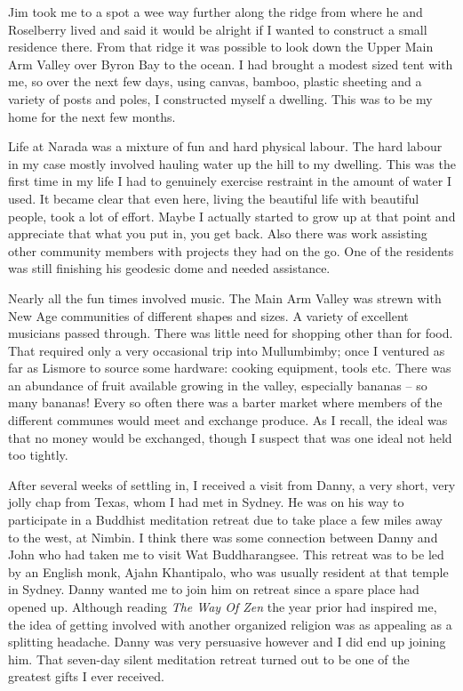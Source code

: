 Jim took me to a spot a wee way further along the ridge from where he
and Roselberry lived and said it would be alright if I wanted to
construct a small residence there. From that ridge it was possible to
look down the Upper Main Arm Valley over Byron Bay to the ocean. I had
brought a modest sized tent with me, so over the next few days, using
canvas, bamboo, plastic sheeting and a variety of posts and poles, I
constructed myself a dwelling. This was to be my home for the next few
months.

Life at Narada was a mixture of fun and hard physical labour. The hard
labour in my case mostly involved hauling water up the hill to my
dwelling. This was the first time in my life I had to genuinely exercise
restraint in the amount of water I used. It became clear that even here,
living the beautiful life with beautiful people, took a lot of effort.
Maybe I actually started to grow up at that point and appreciate that
what you put in, you get back. Also there was work assisting other
community members with projects they had on the go. One of the residents
was still finishing his geodesic dome and needed assistance.

Nearly all the fun times involved music. The Main Arm Valley was strewn
with New Age communities of different shapes and sizes. A variety of
excellent musicians passed through. There was little need for shopping
other than for food. That required only a very occasional trip into
Mullumbimby; once I ventured as far as Lismore to source some hardware:
cooking equipment, tools etc. There was an abundance of fruit available
growing in the valley, especially bananas -- so many bananas! Every so
often there was a barter market where members of the different communes
would meet and exchange produce. As I recall, the ideal was that no
money would be exchanged, though I suspect that was one ideal not held
too tightly.

After several weeks of settling in, I received a visit from Danny, a
very short, very jolly chap from Texas, whom I had met in Sydney. He was
on his way to participate in a Buddhist meditation retreat due to take
place a few miles away to the west, at Nimbin. I think there was some
connection between Danny and John who had taken me to visit Wat
Buddharangsee. This retreat was to be led by an English monk, Ajahn
Khantipalo, who was usually resident at that temple in Sydney. Danny
wanted me to join him on retreat since a spare place had opened up.
Although reading \emph{The Way Of Zen} the year prior had inspired me,
the idea of getting involved with another organized religion was as
appealing as a splitting headache. Danny was very persuasive however and
I did end up joining him. That seven-day silent meditation retreat
turned out to be one of the greatest gifts I ever received.


